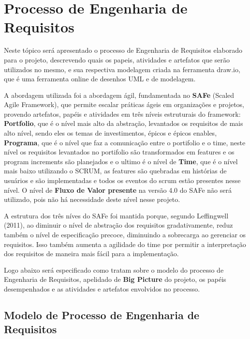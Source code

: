\chapter{Processo de Engenharia de Requisitos}

  Neste tópico será apresentado o processo de Engenharia de Requisitos elaborado para o projeto, descrevendo quais os papeis,
  atividades e artefatos que serão utilizados no mesmo, e sua respectiva modelagem criada na ferramenta draw.io, que é uma
  ferramenta online de desenhos UML e de modelagem.

  A abordagem utilizada foi a abordagem ágil, fundamentada no \textbf{SAFe} (Scaled Agile Framework), que permite escalar práticas
  ágeis em organizações e projetos, provendo artefatos, papéis e atividades em três níveis estruturais do framework: \textbf{Portfolio},
  que é o nível mais alto da abstração, levantados os requisitos de mais alto nível, sendo eles os temas de investimentos, épicos e
  épicos enables, \textbf{Programa}, que é o nível que faz a comunicação entre o portifolio e o time, neste nível os requisitos
  levantados no portifolio são transformados em features e os program increments são planejados e o ultimo é o nível de \textbf{Time},
  que é o nível mais baixo utilizando o SCRUM, as features são quebradas em histórias de usuários e são implementadas e todos os
  eventos do scrum estão presentes nesse nível. O nível de \textbf{Fluxo de Valor presente} na versão 4.0 do SAFe não será utilizado,
  pois não há necessidade deste nível nesse projeto.

  A estrutura dos três níves do SAFe foi mantida porque, segundo Leffingwell (2011), ao diminuir o nível de abstração dos requisitos
  gradativamente, reduz também o nível de especificação precoce, diminuindo a sobrecarga ao gerenciar os requisitos. Isso também
  aumenta a agilidade do time por permitir a interpretação dos requisitos de maneira mais fácil para a implementação.

  Logo abaixo será especificado como tratam sobre o modelo do processo de Engenharia de Requisitos, apelidado de \textbf{Big Picture}
  do projeto, os papéis desempenhados e as atividades e artefatos envolvidos no processo.

\section{Modelo de Processo de Engenharia de Requisitos}

